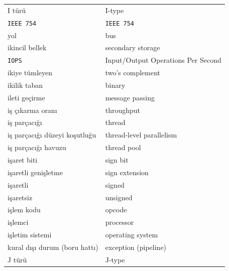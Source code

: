 {\begin{longtable}{@{}p{7.6cm}p{7.6cm}@{}}
I türü & I-type \\
\texttt{IEEE 754} & \texttt{IEEE 754} \\
yol & bus \\
ikincil bellek & secondary storage \\
\texttt{IOPS} & Input/Output Operations Per Second \\
ikiye tümleyen & two's complement \\
ikilik taban & binary \\
ileti geçirme & message passing \\
iş çıkarma oranı & throughput \\
iş parçacığı & thread \\
iş parçacığı düzeyi koşutluğu & thread-level parallelism \\
iş parçacığı havuzu & thread pool \\
işaret biti & sign bit \\
işaretli genişletme & sign extension \\
işaretli & signed \\
işaretsiz & unsigned \\
işlem kodu & opcode \\
işlemci & processor \\
işletim sistemi & operating system \\
kural dışı durum (boru hattı) & exception (pipeline) \\

J türü & J-type \\


\end{longtable}}
